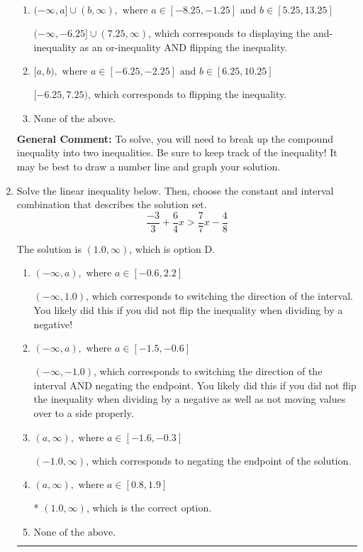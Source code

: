 \documentclass{extbook}[14pt]
\newcommand{\litem}[1]{\item #1

\rule{\textwidth}{0.4pt}}
\begin{document}
\begin{enumerate}
{\begin{enumerate}[label=\Alph*.]
* $(-6.25, 7.25]$, which is the correct option.
\item \( (-\infty, a] \cup (b, \infty), \text{ where } a \in [-8.25, -1.25] \text{ and } b \in [5.25, 13.25] \)

$(-\infty, -6.25] \cup (7.25, \infty)$, which corresponds to displaying the and-inequality as an or-inequality AND flipping the inequality.
\item \( [a, b), \text{ where } a \in [-6.25, -2.25] \text{ and } b \in [6.25, 10.25] \)

$[-6.25, 7.25)$, which corresponds to flipping the inequality.
\item \( \text{None of the above.} \)


\end{enumerate}

\textbf{General Comment:} To solve, you will need to break up the compound inequality into two inequalities. Be sure to keep track of the inequality! It may be best to draw a number line and graph your solution.
}
\litem{
Solve the linear inequality below. Then, choose the constant and interval combination that describes the solution set.
\[ \frac{-3}{3} + \frac{6}{4} x > \frac{7}{7} x - \frac{4}{8} \]

The solution is \( (1.0, \infty) \), which is option D.\begin{enumerate}[label=\Alph*.]
\item \( (-\infty, a), \text{ where } a \in [-0.6, 2.2] \)

 $(-\infty, 1.0)$, which corresponds to switching the direction of the interval. You likely did this if you did not flip the inequality when dividing by a negative!
\item \( (-\infty, a), \text{ where } a \in [-1.5, -0.6] \)

 $(-\infty, -1.0)$, which corresponds to switching the direction of the interval AND negating the endpoint. You likely did this if you did not flip the inequality when dividing by a negative as well as not moving values over to a side properly.
\item \( (a, \infty), \text{ where } a \in [-1.6, -0.3] \)

 $(-1.0, \infty)$, which corresponds to negating the endpoint of the solution.
\item \( (a, \infty), \text{ where } a \in [0.8, 1.9] \)

* $(1.0, \infty)$, which is the correct option.
\item \( \text{None of the above}. \)


\end{enumerate}}
\end{enumerate}
\end{document}

